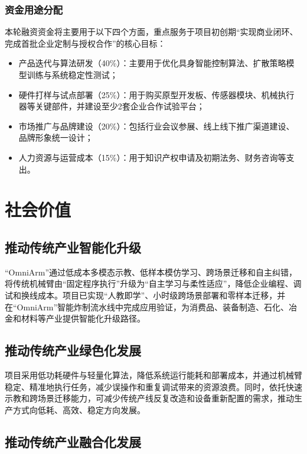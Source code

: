 \documentclass[zihao=-4]{ctexart}
\begin{document}
\subsubsection{资金用途分配}

本轮融资资金将主要用于以下四个方面，重点服务于项目初创期“实现商业闭环、完成首批企业定制与授权合作”的核心目标：

\begin{itemize}[leftmargin=2em]
  \item 产品迭代与算法研发（40\%）：主要用于优化具身智能控制算法、扩散策略模型训练与系统稳定性测试；
  \item 硬件打样与试点部署（25\%）：用于购买原型开发板、传感器模块、机械执行器等关键部件，并建设至少2套企业合作试验平台；
  \item 市场推广与品牌建设（20\%）：包括行业会议参展、线上线下推广渠道建设、品牌形象统一设计；
  \item 人力资源与运营成本（15\%）：用于知识产权申请及初期法务、财务咨询等支出。
\end{itemize}

\section{社会价值}

\subsection{推动传统产业智能化升级}

“OmniArm”通过低成本多模态示教、低样本模仿学习、跨场景迁移和自主纠错，将传统机械臂由“固定程序执行”升级为“自主学习与柔性适应”，降低企业编程、调试和换线成本。项目已实现“人教即学”、小时级跨场景部署和零样本迁移，并在“OmniArm”智能炸制流水线中完成应用验证，为消费品、装备制造、石化、冶金和材料等产业提供智能化升级路径。

\subsection{推动传统产业绿色化发展}

项目采用低功耗硬件与轻量化算法，降低系统运行能耗和部署成本，并通过机械臂稳定、精准地执行任务，减少误操作和重复调试带来的资源浪费。同时，依托快速示教和跨场景迁移能力，可减少传统产线反复改造和设备重新配置的需求，推动生产方式向低耗、高效、稳定方向发展。

\subsection{推动传统产业融合化发展}
\end{document}
